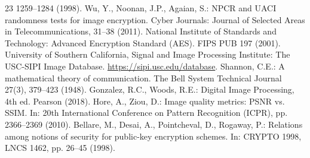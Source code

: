 \documentclass{llncs}
\begin{document}
\begin{thebibliography}{23}
  1259--1284 (1998).
 Wu, Y., Noonan, J.P., Agaian, S.: NPCR and UACI randomness
  tests for image encryption. Cyber Journals: Journal of Selected Areas in
  Telecommunications, 31--38 (2011).
 National Institute of Standards and Technology: Advanced
  Encryption Standard (AES). FIPS PUB 197 (2001).
 University of Southern California, Signal and Image Processing
  Institute: The USC-SIPI Image Database. \url{https://sipi.usc.edu/database}.
 Shannon, C.E.: A mathematical theory of communication. The
  Bell System Technical Journal 27(3), 379--423 (1948).
 Gonzalez, R.C., Woods, R.E.: Digital Image Processing,
  4th ed. Pearson (2018).
 Hore, A., Ziou, D.: Image quality metrics: PSNR vs. SSIM. In:
  20th International Conference on Pattern Recognition (ICPR), pp.
  2366--2369 (2010).
 Bellare, M., Desai, A., Pointcheval, D., Rogaway, P.:
  Relations among notions of security for public-key encryption schemes. In:
  CRYPTO 1998, LNCS 1462, pp. 26--45 (1998).
\end{thebibliography}
\end{document}
